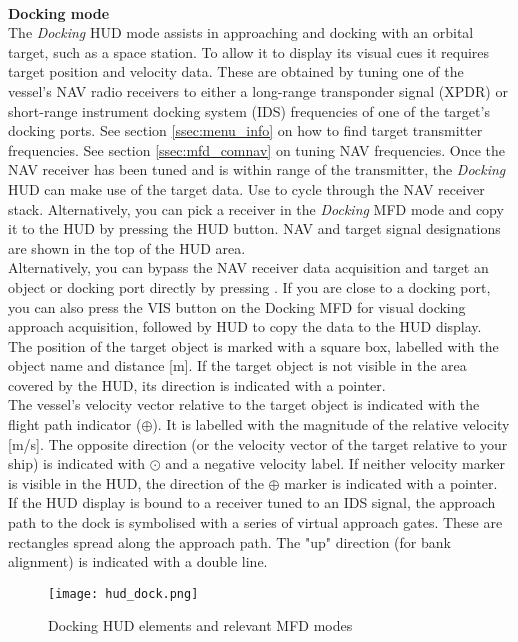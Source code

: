 \documentclass[Orbiter User Manual.tex]{subfiles}
\begin{document}
\noindent
\\
\textbf{Docking mode}\\
The \textit{Docking} HUD mode assists in approaching and docking with an orbital target, such as a space station. To allow it to display its visual cues it requires target position and velocity data. These are obtained by tuning one of the vessel's NAV radio receivers to either a long-range transponder signal (XPDR) or short-range instrument docking system (IDS) frequencies of one of the target's docking ports. See section \ref{ssec:menu_info} on how to find target transmitter frequencies. See section \ref{ssec:mfd_comnav} on tuning NAV frequencies. Once the NAV receiver has been tuned and is within range of the transmitter, the \textit{Docking} HUD can make use of the target data. Use \Ctrl{} to cycle through the NAV receiver stack. Alternatively, you can pick a receiver in the \textit{Docking} MFD mode and copy it to the HUD by pressing the HUD button. NAV and target signal designations are shown in the top of the HUD area.\\
Alternatively, you can bypass the NAV receiver data acquisition and target an object or docking port directly by pressing \Ctrl\Alt{}. If you are close to a docking port, you can also press the VIS button on the Docking MFD for visual docking approach acquisition, followed by HUD to copy the data to the HUD display.\\
The position of the target object is marked with a square box, labelled with the object name and distance [m]. If the target object is not visible in the area covered by the HUD, its direction is indicated with a pointer.\\
The vessel's velocity vector relative to the target object is indicated with the flight path indicator ($\oplus$). It is labelled with the magnitude of the relative velocity [m/s]. The opposite direction (or the velocity vector of the target relative to your ship) is indicated with $\odot$ and a negative velocity label. If neither velocity marker is visible in the HUD, the direction of the $\oplus$ marker is indicated with a pointer.\\
If the HUD display is bound to a receiver tuned to an IDS signal, the approach path to the dock is symbolised with a series of virtual approach gates. These are rectangles spread along the approach path. The "up" direction (for bank alignment) is indicated with a double line.

\begin{figure}[H]
  \centering
  \texttt{[image: hud\_dock.png]}
  \caption{Docking HUD elements and relevant MFD modes}
\end{figure}
\end{document}
